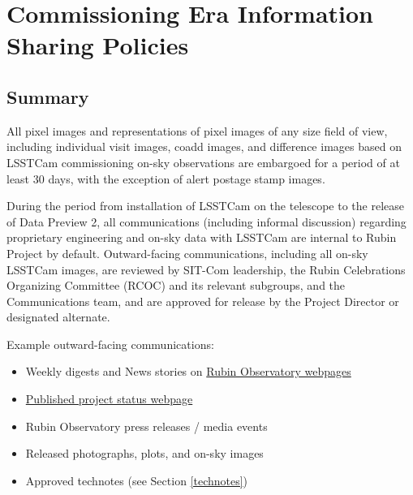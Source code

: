 \documentclass[SE,authoryear,toc,lsstdraft]{lsstdoc}
\begin{document}
\section{Commissioning Era Information Sharing Policies}
\label{policy}

\subsection{Summary}

All pixel images and representations of pixel images of any size field of view, including individual visit images, coadd images, and difference images based on LSSTCam commissioning on-sky observations are embargoed for a period of at least 30 days, with the exception of alert postage stamp images.

During the period from installation of LSSTCam on the telescope to the release of Data Preview 2, all communications (including informal discussion) regarding proprietary engineering and on-sky data with LSSTCam are internal to Rubin Project by default.
Outward-facing communications, including all on-sky LSSTCam images, are reviewed by SIT-Com leadership, the Rubin Celebrations Organizing Committee (RCOC) and its relevant subgroups, and the Communications team, and are approved for release by the Project Director or designated alternate.

Example outward-facing communications:

\begin{itemize}

  \item Weekly digests and News stories on \href{https://rubinobservatory.org/}{Rubin Observatory webpages}

  \item \href{https://www.lsst.org/about/project-status}{Published project status webpage}

  \item Rubin Observatory press releases / media events

  \item Released photographs, plots, and on-sky images

  \item Approved technotes (see Section \ref{technotes})

\end{itemize}
\end{document}

